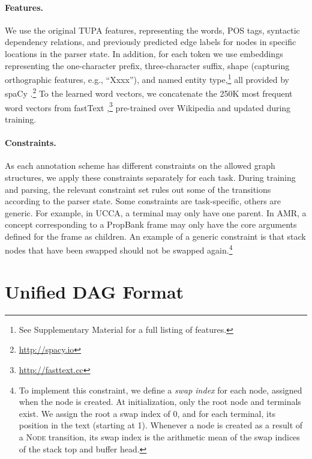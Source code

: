 \documentclass[11pt,a4paper]{article}
\begin{document}
\paragraph{Features.}
We use the original TUPA features,
representing the words, POS tags, syntactic dependency relations, and previously predicted edge labels
for nodes in specific locations in the parser state.
In addition, for each token
we use embeddings representing the one-character prefix, three-character suffix,
shape (capturing orthographic features, e.g., ``Xxxx''),
and named entity type,\footnote{See Supplementary Material for a full listing of features.}
all provided by spaCy \cite{spacy2}.\footnote{\url{http://spacy.io}}
To the learned word vectors, we concatenate the 250K most frequent word vectors from fastText
\cite{bojanowski2016enriching},\footnote{\url{http://fasttext.cc}}
pre-trained over Wikipedia and updated during training.


\paragraph{Constraints.}
As each annotation scheme has different constraints on the allowed graph structures,
we apply these constraints separately for each task.
During training and parsing, the relevant constraint set rules out some of the transitions
according to the parser state.
Some constraints are task-specific, others are generic.
For example, in UCCA, a terminal may only have one parent.
In AMR, a concept corresponding to a PropBank frame may only have 
the core arguments defined for the frame as children.
An example of a generic constraint is that stack nodes 
that have been swapped
should not be swapped again.\footnote{
 To implement this constraint, we define a \textit{swap index}
 for each node, assigned when the node is created.
 At initialization, only the root node and terminals exist.
 We assign the root a swap index of 0, and for each terminal, its
 position in the text (starting at 1).
 Whenever a node is created as a result of a \textsc{Node}
 transition, its swap index is the arithmetic
 mean of the swap indices of the stack top and buffer head.}


\section{Unified DAG Format}\label{sec:format}
\end{document}
